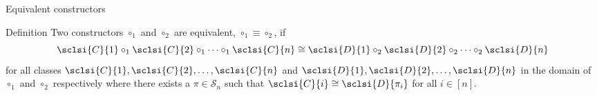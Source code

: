 
\begin{frame}{Equivalent constructors}
    \begin{block}{Definition}
        Two constructors $\circ_1$ and $\circ_2$ are equivalent, $\circ_1 \equiv \circ_2$, if
        \[
            \sclsi{C}{1} \circ_1 \sclsi{C}{2} \circ_1 \dotsm \circ_1 \sclsi{C}{n} \cong \sclsi{D}{1} \circ_2 \sclsi{D}{2} \circ_2 \dotsm \circ_2 \sclsi{D}{n}
        \]
        for all classes $\sclsi{C}{1},\sclsi{C}{2},\dotsc,\sclsi{C}{n}$ and $\sclsi{D}{1},\sclsi{D}{2},\dotsc,\sclsi{D}{n}$ in the domain of $\circ_1$ and $\circ_2$ respectively where there exists a $\pi\in\mathcal{S}_n$ such that $\sclsi{C}{i}\cong\sclsi{D}{\pi_i}$ for all $i\in[n]$.
    \end{block}
\end{frame}